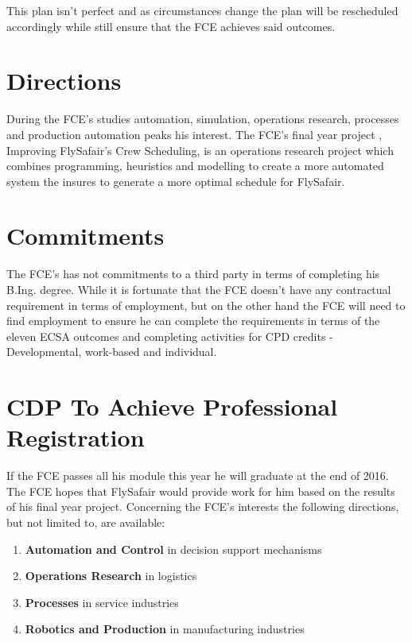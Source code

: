 \documentclass[11pt,a4paper]{article}
\begin{document}
		This plan isn't perfect and as circumstances change the plan will be rescheduled accordingly while still ensure that the FCE achieves said outcomes.
		
	\section{Directions}
		During the FCE's studies automation, simulation, operations research, processes and production automation peaks his interest. 
		The FCE's final year project , Improving FlySafair's Crew Scheduling, is an operations research project which combines programming, heuristics and modelling to create a more automated system the insures to generate a more optimal schedule for FlySafair.
		
	
	\section{Commitments}
		The FCE's has not commitments to a third party in terms of completing his B.Ing. degree.
		While it is fortunate that the FCE doesn't have any contractual requirement in terms of employment, but on the other hand the FCE will need to find employment to ensure he can complete the requirements in terms of the eleven ECSA outcomes and completing activities for CPD credits - Developmental, work-based and individual.
	
	\section{CDP To Achieve Professional Registration}
		If the FCE passes all his module this year he will graduate at the end of 2016.
		The FCE hopes that FlySafair would provide work for him based on the results of his final year project.
		Concerning the FCE's interests the following directions, but not limited to, are available:
		
		\begin{enumerate}
		\item	\textbf{Automation and Control} in decision support mechanisms
		
		\item	\textbf{Operations Research} in logistics
		
		\item	\textbf{Processes} in service industries
		
		\item	\textbf{Robotics and Production} in manufacturing industries
		
		\end{enumerate}
		
\end{document}
